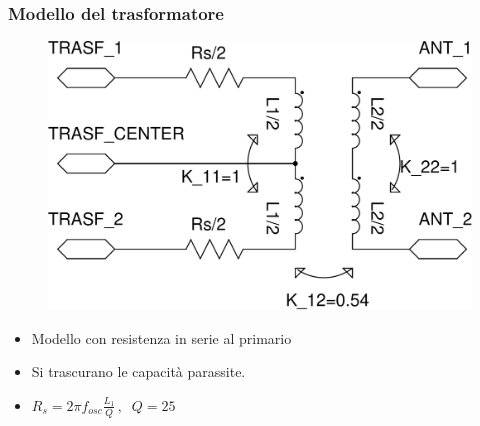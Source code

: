 \documentclass{beamer}
\begin{document}
%
\begin{frame}
\frametitle{Modello del trasformatore}
\begin{figure}
\includegraphics[height=0.4\textheight]{images/trasf_model.pdf}
\end{figure}
\begin{itemize}
	\item Modello con resistenza in serie al primario
	\item Si trascurano le capacit\`a parassite.
	\item $R_s=2\pi f_{osc} \frac{L_1}{Q}\, ,\;\; Q=25$
\end{itemize}
\end{frame}
%
\end{document}
